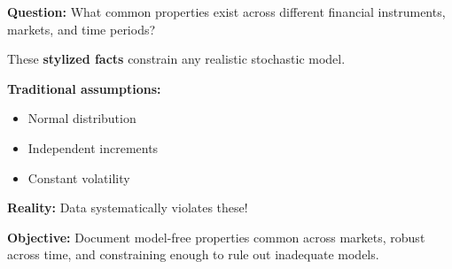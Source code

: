 \documentclass[final]{beamer}
\begin{document}
\begin{frame}[t]
\begin{columns}[t]
\begin{column}{.48\linewidth}
\begin{tcolorbox}[mybox, title=Motivation]
\vspace{0.3cm}
\textbf{Question:} What common properties exist across different financial instruments, markets, and time periods?

\vspace{0.3cm}
These \textbf{stylized facts} constrain any realistic stochastic model.
\end{tcolorbox}

\vspace{0.5cm}

\begin{tcolorbox}[mybox, title=Problem Statement]
\large
\textbf{Traditional assumptions:}
\begin{itemize}
\item Normal distribution
\item Independent increments  
\item Constant volatility
\end{itemize}

\vspace{0.2cm}
\textbf{Reality:} Data systematically violates these!

\vspace{0.2cm}
\textbf{Objective:} Document model-free properties common across markets, robust across time, and constraining enough to rule out inadequate models.
\end{tcolorbox}

\vspace{0.5cm}


\end{column}
\end{columns}
\end{frame}
\end{document}
